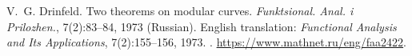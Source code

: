 V.~G. Drinfeld.
\newblock Two theorems on modular curves.
\newblock \emph{Funktsional. Anal. i Prilozhen.}, 7(2):83--84, 1973 (Russian).
\newblock English translation: \emph{Functional Analysis and Its Applications}, 7(2):155--156, 1973.
\newblock {}.
\newblock \url{https://www.mathnet.ru/eng/faa2422}.


